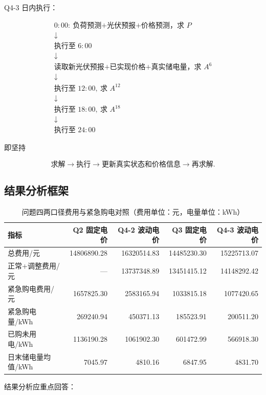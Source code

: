 Q4-3 日内执行：

\[
\boxed{
\begin{array}{c}
0{:}00:\ \text{负荷预测+光伏预报+价格预测，求 }P\\
\downarrow\\
\text{执行至 }6{:}00\\
\downarrow\\
\text{读取新光伏预报+已实现价格+真实储电量，求 }A^6\\
\downarrow\\
\text{执行至 }12{:}00,\ \text{求 }A^{12}\\
\downarrow\\
\text{执行至 }18{:}00,\ \text{求 }A^{18}\\
\downarrow\\
\text{执行至 }24{:}00
\end{array}
}
\]

即坚持

\[
\boxed{
\text{求解}
\rightarrow
\text{执行}
\rightarrow
\text{更新真实状态和价格信息}
\rightarrow
\text{再求解}
}.
\]

\subsection{结果分析框架}



\begin{table}[H]
\centering
{}
\begin{tabular}{lrrrr}
\toprule
指标 & Q2 固定电价 & Q4-2 波动电价 & Q3 固定电价 & Q4-3 波动电价 \\
\midrule
总费用/元 & 14806890.28 & 16320514.83 & 14485230.30 & 15225713.07 \\
正常+调整费用/元 & — & 13737348.89 & 13451415.12 & 14148292.42 \\
紧急购电费用/元 & 1657825.30 & 2583165.94 & 1033815.18 & 1077420.65 \\
紧急购电量/kWh & 269240.94 & 450371.13 & 185523.91 & 200511.20 \\
已购未用电/kWh & 1136190.28 & 1061902.30 & 601472.99 & 566918.30 \\
日末储电量均值/kWh & 7045.97 & 4810.16 & 6847.95 & 4831.70 \\
\bottomrule
\end{tabular}
\caption{问题四两口径费用与紧急购电对照（费用单位：元，电量单位：kWh）}
\label{tab:11}
\end{table}

结果分析应重点回答：


